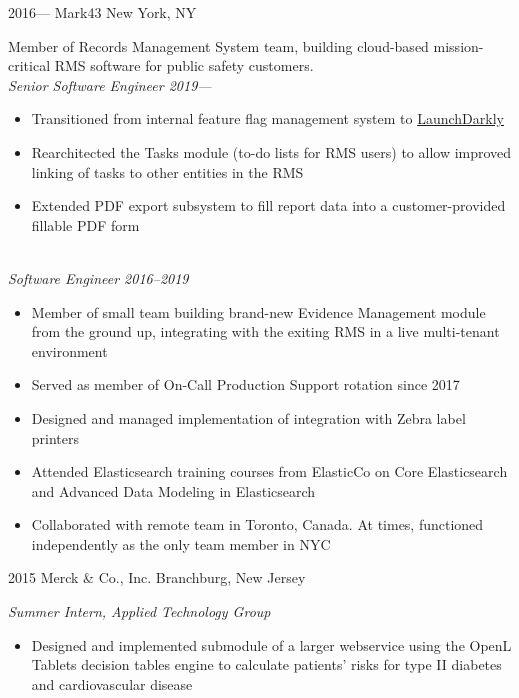 \documentclass[]{friggeri-mlg-cv} %
\begin{document}
\begin{entrylist}
\entry
{2016---}
{Mark43}
{New York, NY}
{Member of Records Management System team, building cloud-based mission-critical 
RMS software for public safety customers.\\
\emph{Senior Software Engineer 2019---}\\
\begin{itemize}[leftmargin=*]
\item Transitioned from internal feature flag management system to 
\href{https://launchdarkly.com}{LaunchDarkly}
\item Rearchitected the Tasks module (to-do lists for RMS users) to allow 
improved linking of tasks to other entities in the RMS
\item Extended PDF export subsystem to fill report data into a customer-provided
fillable PDF form
\end{itemize}
\quad\\
\emph{Software Engineer 2016--2019}\\
\begin{itemize}[leftmargin=*]
\item Member of small team building brand-new Evidence Management module from the 
ground up, integrating with the exiting RMS in a live multi-tenant environment
\item Served as member of On-Call Production Support rotation since 2017
\item Designed and managed implementation of integration with Zebra label printers
\item Attended Elasticsearch training courses from ElasticCo on Core Elasticsearch
and Advanced Data Modeling in Elasticsearch
\item Collaborated with remote team in Toronto, Canada.  At times, functioned 
independently as the only team member in NYC
\end{itemize}}
\entry
{2015}
{Merck \& Co., Inc.}
{Branchburg, New Jersey}
{\emph{Summer Intern, Applied Technology Group}
\begin{itemize}[leftmargin=*]
\item Designed and implemented submodule of a larger webservice using the OpenL 
Tablets decision tables engine to calculate patients' risks for type II diabetes
and cardiovascular disease

\end{itemize}}
\end{entrylist}
\end{document}
